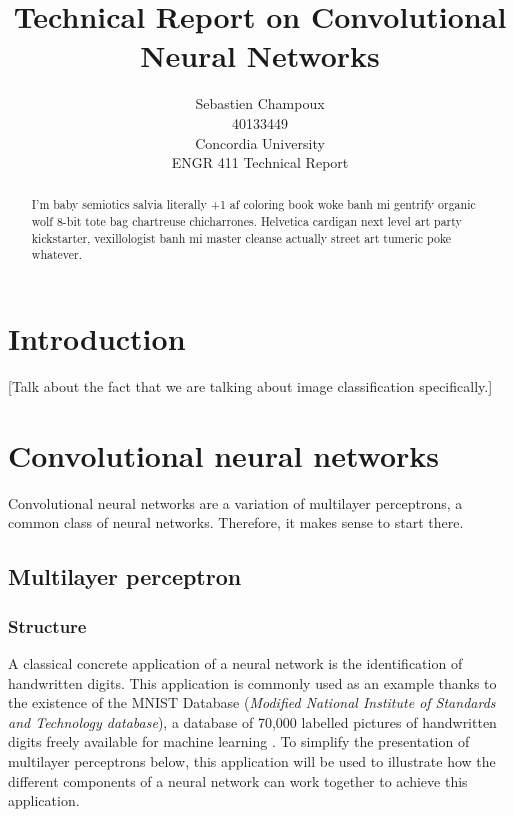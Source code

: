 \documentclass[12pt,a4paper,titlepage]{article}
\begin{document}
\title{Technical Report on Convolutional Neural Networks}
\author{Sebastien Champoux
\\ 40133449
\\ Concordia University
\\ ENGR 411 Technical Report
}
\maketitle

\begin{abstract}
I'm baby semiotics salvia literally +1 af coloring book woke banh mi gentrify organic wolf 8-bit tote bag chartreuse chicharrones. Helvetica cardigan next level art party kickstarter, vexillologist banh mi master cleanse actually street art tumeric poke whatever.
\end{abstract}
\clearpage

\tableofcontents
\clearpage

\listoffigures
\clearpage

\section{Introduction}
[Talk about the fact that we are talking about image classification specifically.]

\section{Convolutional neural networks}
Convolutional neural networks are a variation of multilayer perceptrons, a common class of neural networks. Therefore, it makes sense to start there.

\subsection{Multilayer perceptron}
\subsubsection{Structure}
A classical concrete application of a neural network is the identification of handwritten digits. This application is commonly used as an example thanks to the existence of the MNIST Database (\textit{Modified National Institute of Standards and Technology database}), a database of 70,000 labelled pictures of handwritten digits freely available for machine learning \cite{lecun_mnist_1998}. To simplify the presentation of multilayer perceptrons below, this application will be used to illustrate how the different components of a neural network can work together to achieve this application.
\end{document}
